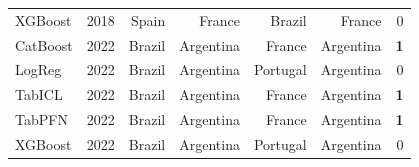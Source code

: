\begin{table}[t]
\begin{tabular}{lrrrrrr}
  XGBoost & 2018 & Spain & France & Brazil & France & 0 \\
  CatBoost & 2022 & Brazil & Argentina & France & Argentina & \textbf{1} \\
  LogReg & 2022 & Brazil & Argentina & Portugal & Argentina & 0 \\
  TabICL & 2022 & Brazil & Argentina & France & Argentina & \textbf{1} \\
  TabPFN & 2022 & Brazil & Argentina & France & Argentina & \textbf{1} \\
  XGBoost & 2022 & Brazil & Argentina & Portugal & Argentina & 0 \\
  \bottomrule
  \end{tabular}
\end{table}
